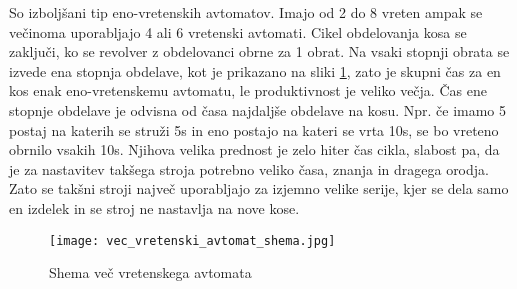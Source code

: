 So izboljšani tip eno-vretenskih avtomatov. Imajo od
2 do 8 vreten ampak se večinoma uporabljajo 4 ali 6
vretenski avtomati. Cikel obdelovanja kosa se zaključi,
ko se revolver z obdelovanci obrne za 1 obrat. Na vsaki stopnji
obrata se izvede ena stopnja obdelave, kot je prikazano na
sliki \ref{vec_vretenc}, zato je skupni čas za en
kos enak eno-vretenskemu avtomatu, le produktivnost je veliko
večja. Čas ene stopnje obdelave je odvisna od časa najdaljše
obdelave na kosu. Npr. če imamo 5 postaj na katerih se struži 5s
in eno postajo na kateri se vrta 10s, se bo vreteno obrnilo vsakih 10s.
Njihova velika prednost je zelo hiter čas cikla, slabost pa,
da je za nastavitev takšega stroja potrebno veliko časa, znanja
in dragega orodja. Zato se takšni stroji največ uporabljajo za
izjemno velike serije, kjer se dela samo en izdelek in se stroj
ne nastavlja na nove kose.

\begin{figure}[H]
	\begin{center}
		\texttt{[image: vec\_vretenski\_avtomat\_shema.jpg]}
		\caption{Shema več vretenskega avtomata
			\cite{vec_vretenska_struznica_shema}}
		\label{vec_vretenc}
	\end{center}
\end{figure}